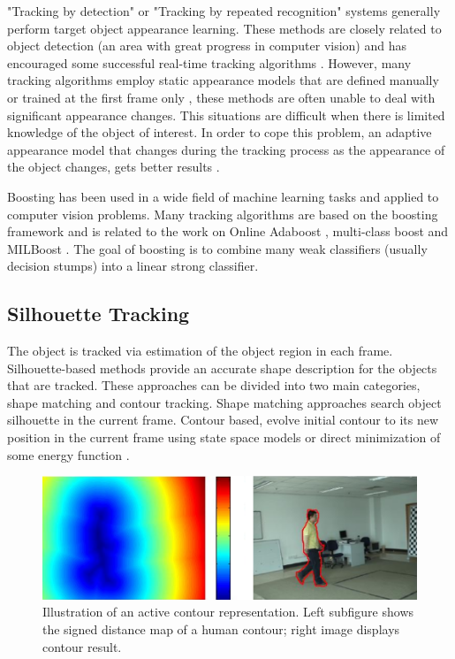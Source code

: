 "Tracking by detection" or "Tracking by repeated recognition" \cite{Mori2006} systems generally perform target object appearance learning. These methods are closely related to object detection (an area with great progress in computer vision) and has encouraged some successful real-time tracking algorithms \cite{Liu2007,Grabner2006}. However, many tracking algorithms employ static appearance models that are defined manually or trained at the first frame only \cite{Isard2001, Lepetit2006, Black1996, Comaniciu2000, Adam2006}, these methods are often unable to deal with significant appearance changes. This situations are difficult when there is limited knowledge of the object of interest. In order to cope this problem, an adaptive appearance model that changes during the tracking process as the appearance of the object changes, gets better results \cite{Ross2007,Matthews2004,Jepson2003}.

Boosting has been used in a wide field of machine learning tasks and applied to computer vision problems. Many tracking algorithms are based on the boosting framework \cite{Freund1997a} and is related to the work on Online Adaboost \cite{Avidan2007,Grabner2008,Oza2000}, multi-class boost \cite{Saffari2010} and MILBoost \cite{Babenko2010}. The goal of boosting is to combine many weak classifiers (usually decision stumps) into a linear strong classifier.


\subsection{Silhouette Tracking}

The object is tracked via estimation of the object region in each frame. Silhouette-based methods provide an accurate shape description for the objects that are tracked. These approaches can be divided into two main categories, shape matching and contour tracking. Shape matching \cite{Li2001} approaches search object silhouette in the current frame. Contour based, evolve initial contour to its new position in the current frame using state space models or direct minimization of some energy function \cite{Cremers2003}.

\begin{figure}[h!]
	\centering
		\includegraphics[width=0.9\linewidth]{Figures/contour.png}
	\caption{Illustration of an active contour representation. Left subfigure shows the signed distance map of a human contour; right image displays contour result.}
	\label{fig::contour}
\end{figure}	

